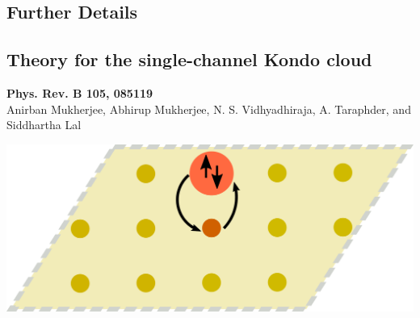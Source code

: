 \documentclass[8pt,aspectratio=169]{beamer}
\begin{document}
\begin{frame}{}
\section{Further Details}
\end{frame}

\begin{frame}{}
\section{Theory for the single-channel Kondo cloud}
\begin{minipage}{0.55\textwidth}
	\small{{\bf Phys. Rev. B 105, 085119}\\[10pt]
Anirban Mukherjee, \alert{Abhirup Mukherjee}, N. S. Vidhyadhiraja, A. Taraphder, and Siddhartha Lal}
\end{minipage}
\hspace*{\fill}
\begin{minipage}{0.4\textwidth}
	\includegraphics[width=\textwidth]{kondo-effect.pdf}
\end{minipage}
\end{frame}
\end{document}

